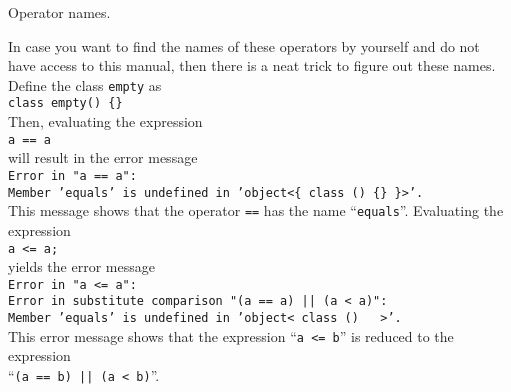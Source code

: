 \begin{enumerate}
\begin{table}[!hbt]
        \caption{Operator names.}
        \label{tab:operator-names}
      \end{table}
      
      In case you want to find the names of these operators by yourself and do not have access to
      this manual, then there is a neat trick to figure out these names.  Define the class
      \texttt{empty} as
      \\[0.2cm]
      \hspace*{1.3cm}
      \texttt{class empty() \{\}}
      \\[0.2cm]
      Then, evaluating the expression
      \\[0.2cm]
      \hspace*{1.3cm}
      \texttt{a == a}
      \\[0.2cm]
      will result in the error message
      \\[0.2cm]
      \hspace*{1.3cm}
      \texttt{Error in "a == a":}       \\
      \hspace*{1.3cm}
      \texttt{Member 'equals' is undefined in 'object<\{ class () \{\} \}>'.}
      \\[0.2cm]
      This message shows that the operator \texttt{==} has the name ``\texttt{equals}''.  Evaluating
      the expression
      \\[0.2cm]
      \hspace*{1.3cm}
      \texttt{a <= a;}
      \\[0.2cm]
      yields the error message
      \\[0.2cm]
      \hspace*{1.3cm}
      \texttt{Error in "a <= a":} \\
      \hspace*{1.3cm}
      \texttt{Error in substitute comparison "(a == a) || (a < a)":} \\
      \hspace*{1.3cm}
      \texttt{Member 'equals' is undefined in 'object<{ class () {  } }>'.}
      \\[0.2cm]
      This error message shows that the expression ``\texttt{a <= b}'' is reduced to the expression \\
      ``\texttt{(a == b) || (a < b)}''.


\end{enumerate}
